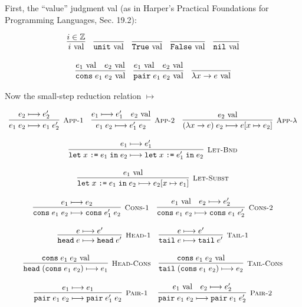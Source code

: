 \documentclass[10pt]{article}
\newcommand{\ttt}[1]{\texttt{#1}}
\newcommand{\ra}{\ensuremath{\rightarrow}}
\newcommand{\reduces}{\ensuremath{\longmapsto}}
\newcommand{\val}{\textnormal{ val}}
\newcommand{\True}{\ttt{True}}
\newcommand{\False}{\ttt{False}}
\newcommand{\head}{\ttt{head}}
\newcommand{\tail}{\ttt{tail}}
\newcommand{\cons}{\ttt{cons}}
\newcommand{\nil}{\ttt{nil}}
\newcommand{\unit}{\ttt{unit}}
\newcommand{\pair}{\ttt{pair}}
\newcommand{\letbnd}{\ttt{let}}
\newcommand{\inexpr}{\ttt{in}}
\newcommand{\labinfer} [3] [] {\infer[{\small\textsc{#1}}]{#2}{#3}}
\begin{document}
First, the ``value'' judgment val (as in Harper's Practical Foundations for Programming Languages, Sec. 19.2):

\[
  \begin{array}{cc}
    \infer{i \val}{i \in \mathbb{Z}}
    ~~~
    \infer{\unit \val}{}
    ~~~
    \infer{\True \val}{}
    ~~~
    \infer{\False \val}{}
    ~~~
    \infer{\nil \val}{}
    \\\\
    \infer{\cons\; e_1\; e_2 \val}{e_1 \val & e_2 \val}
    ~~~
    \infer{\pair\; e_1\; e_2 \val}{e_1 \val & e_2 \val}
    ~~~
    \infer{\lambda x \ra e \val}{}
  \end{array}
\]

\noindent
Now the small-step reduction relation $\reduces$


\[
  \begin{array}{cc}
    \labinfer[App-1]{e_1\; e_2 \reduces e_1\; e_2'}{e_2 \reduces e_2'}
    ~~~
    \labinfer[App-2]{e_1\; e_2 \reduces e_1'\; e_2}{e_1 \reduces e_1' & e_2 \val}
    ~~~
    \labinfer[App-$\lambda$]{(\lambda x \ra e)\; e_2 \reduces e[x\mapsto e_2]}{e_2 \val}
    \\\\
    \labinfer[Let-Bnd]{\letbnd\; x\; \ttt{:=}\; e_1\; \inexpr\; e_2 \reduces \letbnd\; x\; \ttt{:=}\; e_1'\; \inexpr\; e_2}
       {e_1 \reduces e_1'}
    \\\\
    \labinfer[Let-Subst]{\letbnd\; x\; \ttt{:=}\; e_1\; \inexpr\; e_2 \reduces e_2[x\mapsto e_1]}{e_1 \val}
    \\\\
    \labinfer[Cons-1]{\cons\; e_1\; e_2 \reduces \cons\; e_1'\; e_2}{e_1 \reduces e_2}
    ~~~
    \labinfer[Cons-2]{\cons\; e_1\; e_2 \reduces \cons\; e_1\; e_2'}{e_1 \val & e_2 \reduces e_2'}
    \\\\
    \labinfer[Head-1]{\head\; e \reduces \head\; e'}{e \reduces e'}
    ~~~
    \labinfer[Tail-1]{\tail\; e \reduces \tail\; e'}{e \reduces e'}
    \\\\
    \labinfer[Head-Cons]{\head\; (\cons\; e_1\; e_2) \reduces e_1}{\cons\; e_1\; e_2 \val}
    ~~~
    \labinfer[Tail-Cons]{\tail\; (\cons\; e_1\; e_2) \reduces e_2}{\cons\; e_1\; e_2 \val}
    \\\\
    \labinfer[Pair-1]{\pair\; e_1\; e_2 \reduces \pair\; e_1'\; e_2}{e_1 \reduces e_1}
    ~~~~
    \labinfer[Pair-2]{\pair\; e_1\; e_2 \reduces \pair\; e_1\; e_2'}{e_1 \val & e_2 \reduces e_2'}

\end{array}\]
\end{document}
